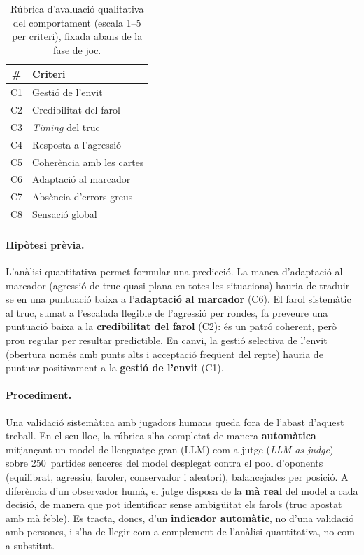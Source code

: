 \begin{table}[H]
  \centering
  \begin{tabular}{cl}
    \toprule
    \# & Criteri \\
    \midrule
    C1 & Gestió de l'envit \\
    C2 & Credibilitat del farol \\
    C3 & \emph{Timing} del truc \\
    C4 & Resposta a l'agressió \\
    C5 & Coherència amb les cartes \\
    C6 & Adaptació al marcador \\
    C7 & Absència d'errors greus \\
    C8 & Sensació global \\
    \bottomrule
  \end{tabular}
  \caption{Rúbrica d'avaluació qualitativa del comportament (escala 1--5 per criteri),
           fixada abans de la fase de joc.}%
  \label{tab:res-rubrica}
\end{table}

\paragraph{Hipòtesi prèvia.} L'anàlisi quantitativa permet formular una predicció. La manca
d'adaptació al marcador (agressió de truc quasi plana en totes les situacions) hauria de
traduir-se en una puntuació baixa a l'\textbf{adaptació al marcador} (C6). El farol
sistemàtic al truc, sumat a l'escalada llegible de l'agressió per rondes, fa preveure una
puntuació baixa a la \textbf{credibilitat del farol} (C2): és un patró coherent, però prou
regular per resultar predictible. En canvi, la gestió selectiva de l'envit (obertura només
amb punts alts i acceptació freqüent del repte) hauria de puntuar positivament a la
\textbf{gestió de l'envit} (C1).

\paragraph{Procediment.} Una validació sistemàtica amb jugadors humans queda fora de l'abast
d'aquest treball. En el seu lloc, la rúbrica s'ha completat de manera \textbf{automàtica}
mitjançant un model de llenguatge gran (LLM) com a jutge (\emph{LLM-as-judge}) sobre
250~partides senceres del model desplegat contra el pool d'oponents (equilibrat, agressiu,
faroler, conservador i aleatori), balancejades per posició. A diferència d'un observador
humà, el jutge disposa de la \textbf{mà real} del model a cada decisió, de manera que pot
identificar sense ambigüitat els farols (truc apostat amb mà feble). Es tracta, doncs, d'un
\textbf{indicador automàtic}, no d'una validació amb persones, i s'ha de llegir com a
complement de l'anàlisi quantitativa, no com a substitut.


